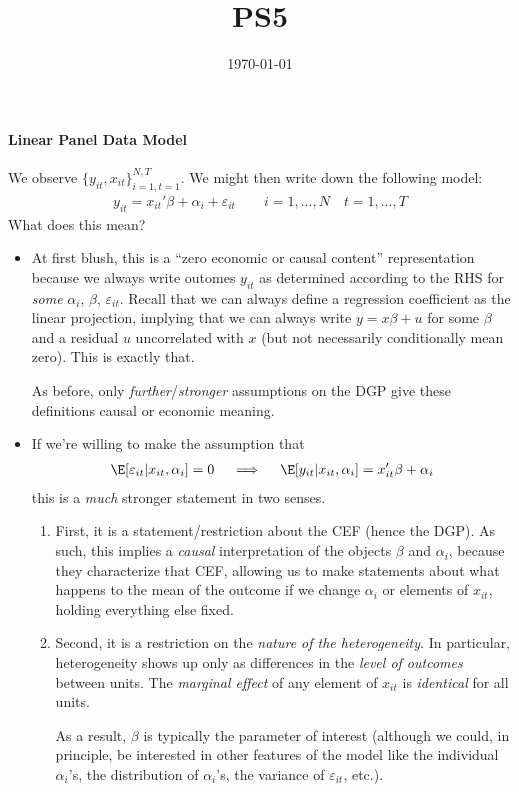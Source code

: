 \documentclass[12pt]{article}
\author{}
\title{PS5}
\date{\today}
\theoremstyle{plain}
\theoremstyle{definition}
\theoremstyle{remark}
\begin{document}


\paragraph{Linear Panel Data Model}
We observe $\{y_{it},x_{it}\}_{i=1,t=1}^{N,T}$.
We might then write down the following model:
\begin{align}
  y_{it}
  =
  x_{it}'\beta
  + \alpha_i
  + \varepsilon_{it}
  \qquad
  i = 1,\ldots,N
  \quad
  t = 1,\ldots,T
  \label{panelmodel}
\end{align}
What does this mean?
\begin{itemize}
  \item At first blush, this is a ``zero economic or causal content''
    representation because we always write outomes $y_{it}$ as
    determined according to the RHS for \emph{some} $\alpha_i$, $\beta$,
    $\varepsilon_{it}$.
    Recall that we can always define a regression coefficient as
    the linear projection, implying that we can always write
    $y=x\beta +u$ for some $\beta$ and a residual $u$ uncorrelated with
    $x$ (but not necessarily conditionally mean zero).
    This is exactly that.

    As before, only \emph{further}/\emph{stronger} assumptions on the
    DGP give these definitions causal or economic meaning.

  \item If we're willing to make the assumption that
    \begin{align}
      \E[\varepsilon_{it}|x_{it},\alpha_i]=0
      \quad\implies\quad
        \E[y_{it}|x_{it},\alpha_i] = x_{it}'\beta + \alpha_i
        \label{panelcausal}
    \end{align}
    this is a \emph{much} stronger statement in two senses.
    \begin{enumerate}[label=(\roman*)]
      \item First, it is a statement/restriction about the CEF (hence
        the DGP).
        As such, this implies a \emph{causal} interpretation of the
        objects $\beta$ and $\alpha_i$, because they characterize that
        CEF, allowing us to make statements about what happens to the
        mean of the outcome if we change $\alpha_i$ or elements of
        $x_{it}$, holding everything else fixed.

      \item Second, it is a restriction on the
        \emph{nature of the heterogeneity}.
        In particular, heterogeneity shows up only as
        differences in the \emph{level of outcomes} between units.
        The \emph{marginal effect} of any element of $x_{it}$ is
        \emph{identical} for all units.

        As a result, $\beta$ is typically the parameter of interest
        (although we could, in principle, be interested in other
        features of the model like the individual $\alpha_i$'s, the
        distribution of $\alpha_i$'s, the variance of
        $\varepsilon_{it}$, etc.).
    \end{enumerate}
\end{itemize}
\end{document}
